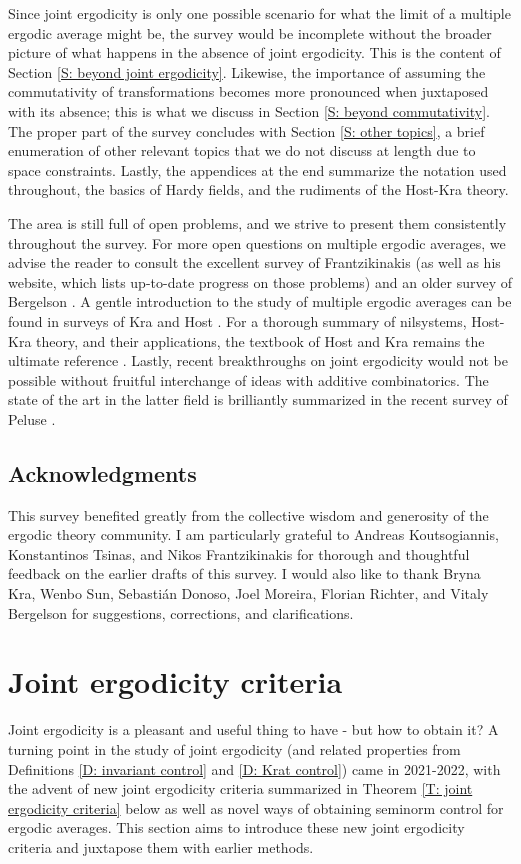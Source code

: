 \documentclass[11pt]{amsart}
\theoremstyle{definition}
\newcommand{\1}{{\mathbf{1}}}
\begin{document}
Since joint ergodicity is only one possible scenario for what the limit of a multiple ergodic average might be, the survey would be incomplete without the broader picture of what happens in the absence of joint ergodicity. This is the content of Section \ref{S: beyond joint ergodicity}. Likewise, the importance of assuming the commutativity of transformations becomes more pronounced when juxtaposed with its absence; this is what we discuss in Section \ref{S: beyond commutativity}. The proper part of the survey concludes with Section \ref{S: other topics}, a brief enumeration of other relevant topics that we do not discuss at length due to space constraints. Lastly, the appendices at the end summarize the notation used throughout, the basics of Hardy fields, and the rudiments of the Host-Kra theory.

The area is still full of open problems, and we strive to present them consistently throughout the survey. For more open questions on multiple ergodic averages, we advise the reader to consult the excellent survey of Frantzikinakis \cite{Fr16} (as well as his website, which lists up-to-date progress on those problems) and an older survey of Bergelson \cite{Ber96}. A gentle introduction to the study of multiple ergodic averages can be found in surveys of Kra \cite{Kra07} and Host \cite{H06}.
For a thorough summary of nilsystems, Host-Kra theory, and their applications, the textbook of Host and Kra remains the ultimate reference \cite{HK18}. Lastly, recent breakthroughs on joint ergodicity would not be possible without fruitful interchange of ideas with additive combinatorics. The state of the art in the latter field is brilliantly summarized in the recent survey of Peluse \cite{Pel24}.

\subsection{Acknowledgments}
This survey benefited greatly from the collective wisdom and generosity of the ergodic theory community. I am particularly grateful to Andreas Koutsogiannis, Konstantinos Tsinas, and Nikos Frantzikinakis for thorough and thoughtful feedback on the earlier drafts of this survey. I would also like to thank Bryna Kra, Wenbo Sun, Sebasti\'an Donoso, Joel Moreira, Florian Richter, and Vitaly Bergelson for suggestions, corrections, and clarifications.

\section{Joint ergodicity criteria}\label{S: joint ergodicity criteria}
Joint ergodicity is a pleasant and useful thing to have - but how to obtain it? A turning point in the study of joint ergodicity (and related properties from Definitions \ref{D: invariant control} and \ref{D: Krat control}) came in 2021-2022, with the advent of new joint ergodicity criteria summarized in Theorem \ref{T: joint ergodicity criteria} below as well as novel ways of obtaining seminorm control for ergodic averages. This section aims to introduce these new joint ergodicity criteria and juxtapose them with earlier methods.
\end{document}
